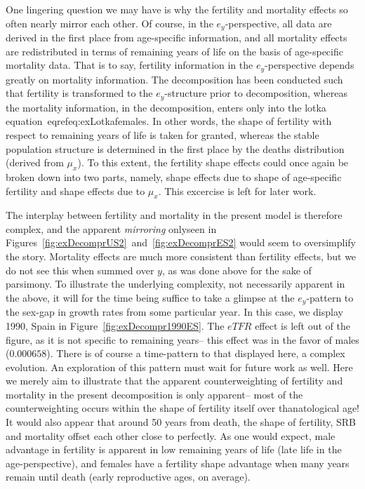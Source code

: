  One lingering question we may have is why the fertility and mortality effects
 so often nearly mirror each other. Of course, in the $e_y$-perspective, all
 data are derived in the first place from age-specific information, and all mortality
 effects are redistributed in terms of remaining years of life on the basis of
 age-specific mortality data. That is to say, fertility information in the
 $e_y$-perspective depends greatly on mortality information. The decomposition
 has been conducted such that fertility is transformed to the $e_y$-structure
 prior to decomposition, whereas the mortality information, in the
 decomposition, enters only into the lotka equation~eqref{eq:exLotkafemales}. In
 other words, the shape of fertility with respect to remaining years of life is
 taken for granted, whereas the stable population structure is determined in the
 first place by the deaths distribution (derived from $\mu_x$). To this extent,
 the fertility shape effects could once again be broken down into two parts,
 namely, shape effects due to shape of age-specific fertility and shape effects
 due to $\mu_x$. This excercise is left for later work. 
 
The interplay between fertility and mortality in the present model is therefore
complex, and the apparent \textit{mirroring} onlyseen in
Figures~\ref{fig:exDecomprUS2}~and~\ref{fig:exDecomprES2} would seem to
oversimplify the story. Mortality effects are much more consistent than
fertility effects, but we do not see this when summed over $y$, as was done
above for the sake of parsimony. To illustrate the underlying complexity, not
necessarily apparent in the above, it will for the time being suffice to take a
glimpse at the $e_y$-pattern to the sex-gap in growth rates from some particular
year. In this case, we display 1990, Spain in Figure~\ref{fig:exDecompr1990ES}.
The $eTFR$ effect is left out of the figure, as it is not specific to
remaining years-- this effect was in the favor of males ($0.000658$). There is
of course a time-pattern to that displayed here, a complex evolution. An exploration 
of this pattern must wait for future work as well. Here we merely aim to illustrate 
that the apparent counterweighting of fertility and mortality in the present decomposition is only
apparent-- most of the counterweighting occurs within the shape of fertility
itself over thanatological age! It would also appear that around 50 years from
death, the shape of fertility, SRB and mortality offset each other close to
perfectly. As one would expect, male advantage in fertility is apparent in low
remaining years of life (late life in the age-perspective), and females have a
fertility shape advantage when many years remain until death (early
reproductive ages, on average). 


